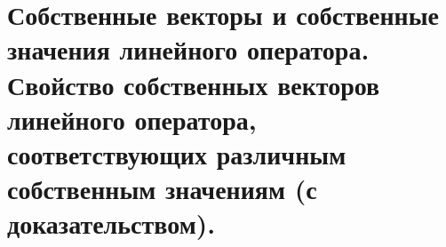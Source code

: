 \section{
    Собственные векторы и собственные значения линейного оператора. Свойство собственных векторов линейного оператора, соответствующих различным собственным значениям (с доказательством).
}
